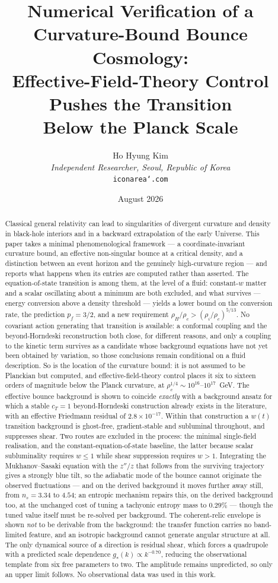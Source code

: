 \documentclass[a4paper,11pt]{article}
\title{\textbf{Numerical Verification of a Curvature-Bound Bounce Cosmology:\\
Effective-Field-Theory Control Pushes the Transition\\
Below the Planck Scale}}
\author{Ho Hyung Kim\\[4pt]
\small\textit{Independent Researcher, Seoul, Republic of Korea}\\
\small\texttt{iconarea\char`\@gmail.com}}
\date{August 2026}
\begin{document}
\maketitle

\begin{abstract}
Classical general relativity can lead to singularities of divergent curvature and density in black-hole interiors and in a backward extrapolation of the early Universe. This paper takes a minimal phenomenological framework --- a coordinate-invariant curvature bound, an effective non-singular bounce at a critical density, and a distinction between an event horizon and the genuinely high-curvature region --- and reports what happens when its entries are computed rather than asserted. The equation-of-state transition is among them, at the level of a fluid: constant-$w$ matter and a scalar oscillating about a minimum are both excluded, and what survives --- energy conversion above a density threshold --- yields a lower bound on the conversion rate, the prediction $p_f=3/2$, and a new requirement $\rho_H/\rho_c>(\rho_i/\rho_c)^{5/13}$. No covariant action generating that transition is available: a conformal coupling and the beyond-Horndeski reconstruction both close, for different reasons, and only a coupling to the kinetic term survives as a candidate whose background equations have not yet been obtained by variation, so those conclusions remain conditional on a fluid description. So is the location of the curvature bound: it is not assumed to be Planckian but computed, and effective-field-theory control places it six to sixteen orders of magnitude below the Planck curvature, at $\rho_c^{1/4}\sim10^{16}$--$10^{17}$~GeV. The effective bounce background is shown to coincide \emph{exactly} with a background ansatz for which a stable $c_T=1$ beyond-Horndeski construction already exists in the literature, with an effective Friedmann residual of $2.8\times10^{-17}$. Within that construction a $w(t)$ transition background is ghost-free, gradient-stable and subluminal throughout, and suppresses shear. Two routes are excluded in the process: the minimal single-field realisation, and the constant-equation-of-state baseline, the latter because scalar subluminality requires $w\le1$ while shear suppression requires $w>1$. Integrating the Mukhanov--Sasaki equation with the $z''/z$ that follows from the surviving trajectory gives a strongly blue tilt, so the adiabatic mode of the bounce cannot originate the observed fluctuations --- and on the derived background it moves further away still, from $n_s=3.34$ to $4.54$; an entropic mechanism repairs this, on the derived background too, at the unchanged cost of tuning a tachyonic entropy mass to $0.29\%$ --- though the tuned value itself must be re-solved per background. The coherent-relic envelope is shown \emph{not} to be derivable from the background: the transfer function carries no band-limited feature, and an isotropic background cannot generate angular structure at all. The only dynamical source of a direction is residual shear, which forces a quadrupole with a predicted scale dependence $g_*(k)\propto k^{-0.70}$, reducing the observational template from six free parameters to two. The amplitude remains unpredicted, so only an upper limit follows. No observational data was used in this work.

\end{abstract}
\end{document}
